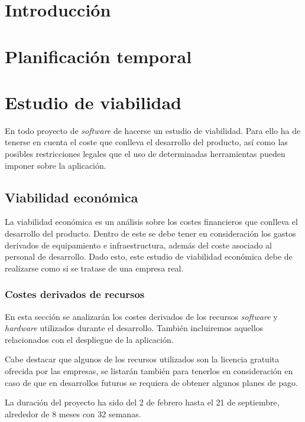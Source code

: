 
\section{Introducción}

\section{Planificación temporal}

\section{Estudio de viabilidad}

En todo proyecto de \textit{software} de hacerse un estudio de viabilidad. Para ello ha de tenerse en cuenta el coste que conlleva el desarrollo del producto, así como las posibles restricciones legales que el uso de determinadas herramientas pueden imponer sobre la aplicación.
\subsection{Viabilidad económica}
La viabilidad económica es un análisis sobre los costes financieros que conlleva el desarrollo del producto. Dentro de este se debe tener en consideración los gastos derivados de equipamiento e infraestructura, además del coste asociado al personal de desarrollo. Dado esto, este estudio de viabilidad económica debe de realizarse como si se tratase de una empresa real.

\subsubsection{Costes derivados de recursos}
En esta sección se analizarán los costes derivados de los recursos \textit{software} y \textit{hardware} utilizados durante el desarrollo. También incluiremos aquellos relacionados con el despliegue de la aplicación.

Cabe destacar que algunos de los recursos utilizados son la licencia gratuita ofrecida por las empresas, se listarán también para tenerlos en consideración en caso de que en desarrollos futuros se requiera de obtener algunos planes de pago.

La duración del proyecto ha sido del 2 de febrero hasta el 21 de septiembre, alrededor de 8 meses con 32 semanas. 

